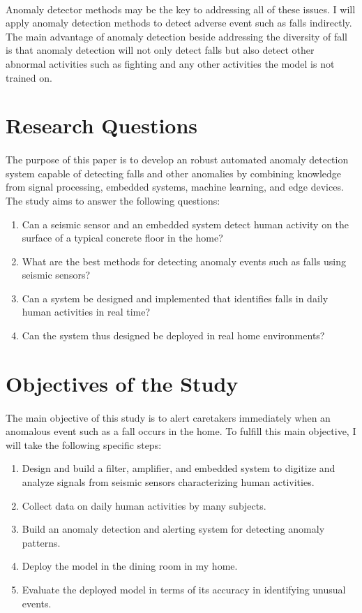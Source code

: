 \paragraph{}
Anomaly detector methods may be the key to addressing all of these issues. I will apply  anomaly detection methods to detect adverse event such as falls indirectly. The main advantage of anomaly detection beside addressing the diversity of fall is that anomaly detection will not only detect falls but also detect other abnormal activities such as fighting and any other activities the model is not trained on.


\section{Research Questions}
\paragraph{}
The purpose of this paper is to develop an robust automated anomaly detection system capable of detecting falls and other anomalies by combining knowledge from signal processing, embedded systems, machine learning, and edge devices. The study aims to answer the following questions:
\begin{enumerate}
\item Can a seismic sensor and an embedded system detect human activity on the surface of a typical concrete floor in the home?
\item What are the best methods for detecting anomaly events such as falls using seismic sensors?
\item Can a system be designed and implemented that identifies falls in daily human activities in real time?
\item Can the system thus designed be deployed in real home environments?
\end{enumerate}

\section{Objectives of the Study}
\paragraph{}
The main objective of this study is to alert caretakers immediately when an anomalous event such as a fall occurs in the home. To fulfill this main objective, I will take the following specific steps:
\begin{enumerate}
\item Design and build a filter, amplifier, and embedded system to digitize and analyze signals from seismic sensors characterizing human activities.
\item Collect data on daily human activities by many subjects.
\item Build an anomaly detection and alerting system for detecting anomaly patterns.
\item Deploy the model in the dining room in my home.
\item Evaluate the deployed model in terms of its accuracy in identifying unusual events.
\end{enumerate}

